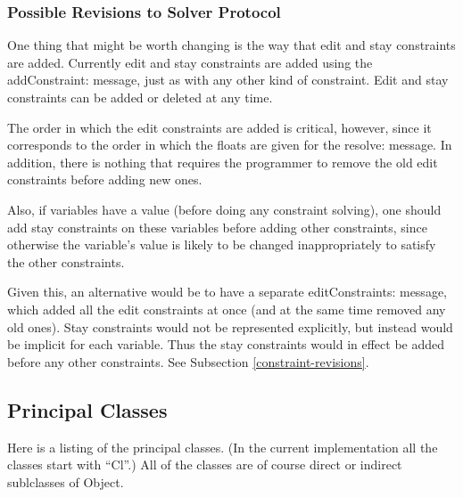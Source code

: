 \documentclass{article}
\begin{document}
\subsubsection{Possible Revisions to Solver Protocol}

One thing that might be worth changing is the way that edit and stay
constraints are added.  Currently edit and stay constraints are added using
the {\sf addConstraint:} message, just as with any other kind of
constraint.  Edit and stay constraints can be added or deleted at any time.

The order in which the edit constraints are added is critical, however,
since it corresponds to the order in which the floats are given for the
{\sf resolve:} message.  In addition, there is nothing that requires the
programmer to remove the old edit constraints before adding new ones.

Also, if variables have  a value (before doing any constraint solving), one
should add stay constraints on these variables before adding other
constraints, since otherwise the variable's value is likely to be changed
inappropriately to satisfy the other constraints.

Given this, an alternative would be to have a separate {\sf
editConstraints:} message, which added all the edit constraints at once
(and at the same time removed any old ones).  Stay constraints would not be
represented explicitly, but instead would be implicit for each variable.
Thus the stay constraints would in effect be added before any other
constraints.  See Subsection \ref{constraint-revisions}.

\subsection{Principal Classes}

Here is a listing of the principal classes.  (In the current implementation
all the classes start with ``{\sf Cl}''.)  All of the classes are of course
direct or indirect sublclasses of {\sf Object}.
\end{document}
